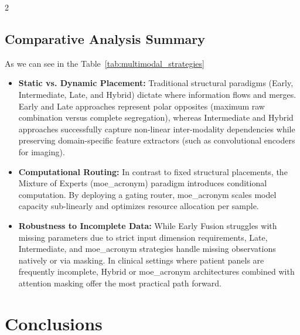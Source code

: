 \documentclass[10pt]{article}
\begin{document}
\begin{multicols}{2}
\subsection{Comparative Analysis Summary}
As we can see in the Table~\ref{tab:multimodal_strategies}
\begin{itemize}
  \item \textbf{Static vs. Dynamic Placement:} Traditional structural paradigms (Early, Intermediate, Late, and Hybrid) dictate where information flows and merges. Early and Late approaches represent polar opposites (maximum raw combination versus complete segregation), whereas Intermediate and Hybrid approaches successfully capture non-linear inter-modality dependencies while preserving domain-specific feature extractors (such as convolutional encoders for imaging).
  \item \textbf{Computational Routing:} In contrast to fixed structural placements, the Mixture of Experts (\gls{moe_acronym}) paradigm introduces conditional computation. By deploying a gating router, \gls{moe_acronym} scales model capacity sub-linearly and optimizes resource allocation per sample.
  \item \textbf{Robustness to Incomplete Data:} While Early Fusion struggles with missing parameters due to strict input dimension requirements, Late, Intermediate, and \gls{moe_acronym} strategies handle missing observations natively or via masking. In clinical settings where patient panels are frequently incomplete, Hybrid or \gls{moe_acronym} architectures combined with attention masking offer the most practical path forward.
\end{itemize}

\section{Conclusions}

\newpage
\glsaddall
\printglossaries

\newpage
\printbibliography
\clearpage
\end{multicols}
\onecolumn
\appendix
\end{document}
